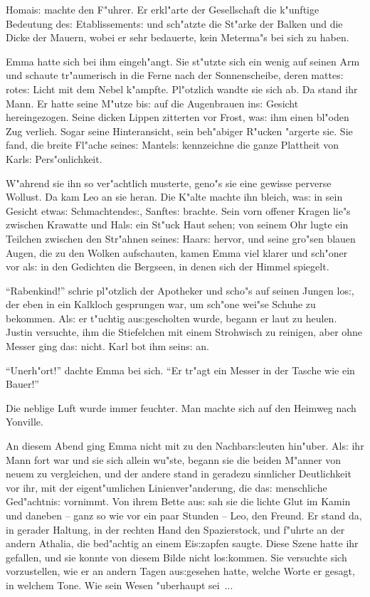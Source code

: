 \documentclass[oneside,12pt]{book}
\newcommand{\s}{s:}%
\begin{document}
Homai{\s} machte den F"uhrer. Er erkl"arte der Gesellschaft die
k"unftige Bedeutung de{\s} Etablissement{\s} und sch"atzte die
St"arke der Balken und die Dicke der Mauern, wobei er sehr
bedauerte, kein Meterma"s bei sich zu haben.

Emma hatte sich bei ihm eingeh"angt. Sie st"utzte sich ein wenig
auf seinen Arm und schaute tr"aumerisch in die Ferne nach der
Sonnenscheibe, deren matte{\s} rote{\s} Licht mit dem Nebel
k"ampfte. Pl"otzlich wandte sie sich ab. Da stand ihr Mann. Er
hatte seine M"utze bi{\s} auf die Augenbrauen in{\s} Gesicht
hereingezogen. Seine dicken Lippen zitterten vor Frost, wa{\s} ihm
einen bl"oden Zug verlieh. Sogar seine Hinteransicht, sein
beh"abiger R"ucken "argerte sie. Sie fand, die breite Fl"ache
seine{\s} Mantel{\s} kennzeichne die ganze Plattheit von Karl{\s}
Pers"onlichkeit.

W"ahrend sie ihn so ver"achtlich musterte, geno"s sie eine gewisse
perverse Wollust. Da kam Leo an sie heran. Die K"alte machte ihn
bleich, wa{\s} in sein Gesicht etwa{\s} Schmachtende{\s},
Sanfte{\s} brachte. Sein vorn offener Kragen lie"s zwischen
Krawatte und Hal{\s} ein St"uck Haut sehen; von seinem Ohr lugte
ein Teilchen zwischen den Str"ahnen seine{\s} Haar{\s} hervor, und
seine gro"sen blauen Augen, die zu den Wolken aufschauten, kamen
Emma viel klarer und sch"oner vor al{\s} in den Gedichten die
Bergseen, in denen sich der Himmel spiegelt.

"`Rabenkind!"' schrie pl"otzlich der Apotheker und scho"s auf
seinen Jungen lo{\s}, der eben in ein Kalkloch gesprungen war, um
sch"one wei"se Schuhe zu bekommen. Al{\s} er t"uchtig
au{\s}gescholten wurde, begann er laut zu heulen. Justin
versuchte, ihm die Stiefelchen mit einem Strohwisch zu reinigen,
aber ohne Messer ging da{\s} nicht. Karl bot ihm sein{\s} an.

"`Unerh"ort!"' dachte Emma bei sich. "`Er tr"agt ein Messer in der
Tasche wie ein Bauer!"'

Die neblige Luft wurde immer feuchter. Man machte sich auf den
Heimweg nach Yonville.

An diesem Abend ging Emma nicht mit zu den Nachbar{\s}leuten
hin"uber. Al{\s} ihr Mann fort war und sie sich allein wu"ste,
begann sie die beiden M"anner von neuem zu vergleichen, und der
andere stand in geradezu sinnlicher Deutlichkeit vor ihr, mit der
eigent"umlichen Linienver"anderung, die da{\s} menschliche
Ged"achtni{\s} vornimmt. Von ihrem Bette au{\s} sah sie die lichte
Glut im Kamin und daneben -- ganz so wie vor ein paar Stunden --
Leo, den Freund. Er stand da, in gerader Haltung, in der rechten
Hand den Spazierstock, und f"uhrte an der andern Athalia, die
bed"achtig an einem Ei{\s}zapfen saugte. Diese Szene hatte ihr
gefallen, und sie konnte von diesem Bilde nicht lo{\s}kommen. Sie
versuchte sich vorzustellen, wie er an andern Tagen au{\s}gesehen
hatte, welche Worte er gesagt, in welchem Tone. Wie sein Wesen
"uberhaupt sei~...
\end{document}

